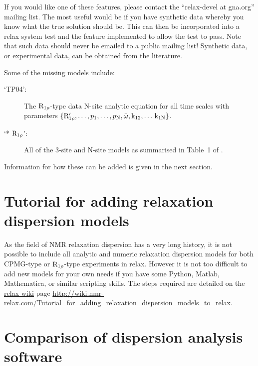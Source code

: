 If you would like one of these features, please contact the ``relax-devel at gna.org'' mailing list.
The most useful would be if you have synthetic data whereby you know what the true solution should be.
This can then be incorporated into a relax system test and the feature implemented to allow the test to pass.
Note that such data should never be emailed to a public mailing list!
Synthetic data, or experimental data, can be obtained from the literature.

Some of the missing models include:
\begin{description}
  \item[`TP04':]  The $\mathrm{R}_{1\rho}$-type data \citet{TrottPalmer04} N-site analytic equation for all time scales with parameters $\{\mathrm{R}_{1\rho}', \dots, p_\textrm{1}, \dots, p_\textrm{N}, \bar\omega, \textrm{k}_\textrm{12}, \dots\, \textrm{k}_\textrm{1N}\}$.
  \item[`* $\mathrm{R}_{1\rho}$':]  All of the 3-site and N-site models as summarised in Table~1 of \citet{PalmerMassi06}.
\end{description}

Information for how these can be added is given in the next section.



\section{Tutorial for adding relaxation dispersion models}
\label{sect: dispersion: model tutorial}

As the field of NMR relaxation dispersion has a very long history, it is not possible to include all analytic and numeric relaxation dispersion models for both CPMG-type or $\mathrm{R}_{1\rho}$-type experiments in relax.
However it is not too difficult to add new models for your own needs if you have some Python, Matlab, Mathematica, or similar scripting skills.
The steps required are detailed on the \href{http://wiki.nmr-relax.com/}{relax wiki} page \url{http://wiki.nmr-relax.com/Tutorial\_for\_adding\_relaxation\_dispersion\_models\_to\_relax}.



\section{Comparison of dispersion analysis software}
\label{sect: dispersion: software comparison}


